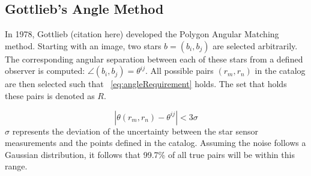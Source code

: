 \begin{figure}
\end{figure}


\subsection{Gottlieb's Angle Method}\label{subsec:gottlieb'sAngleMethod}
In 1978, Gottlieb (citation here) developed the Polygon Angular Matching method.
Starting with an image, two stars $b = (b_i, b_j)$ are selected arbitrarily.
The corresponding angular separation between each of these stars from a defined observer is computed:
$\angle (b_i, b_j) = \theta^{ij}$.
All possible pairs $(r_m, r_n)$ in the catalog are then selected such that ~\autoref{eq:angleRequirement} holds.
The set that holds these pairs is denoted as $R$.

\begin{equation}
    \label{eq:angleRequirement}
    | \theta(r_m, r_n) - \theta^{ij} | < 3 \sigma
\end{equation}
$\sigma$ represents the deviation of the uncertainty between the star sensor measurements and the points defined in the
catalog.
Assuming the noise follows a Gaussian distribution, it follows that 99.7\% of all true pairs will be within this range.

